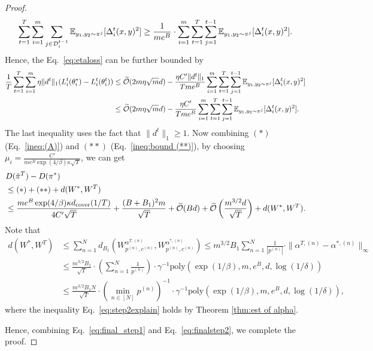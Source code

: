 \begin{proof}
\begin{align}
    \sum_{t=1}^T \sum_{i=1}^m \sum_{j \in \mathcal{D}_i^{t-1}}\mathbb{E}_{y_1,y_2\sim \pi^j}[\Delta_i^t(x,y)^2] \ge \frac{1}{me^B}\cdot \sum_{i=1}^m \sum_{t=1}^T \sum_{j=1}^{t-1}\mathbb{E}_{y_1,y_2\sim \pi^j} [\Delta_i^t(x,y)^2].\nonumber
\end{align}
Hence, the Eq.~\eqref{eq:etaloss} can be further bounded by 
\begin{align}
    \frac{1}{T}\sum_{t=1}^T \sum_{i=1}^m \eta \|d^t\|_1(L_i^t(\theta_i^*) - L_i^t(\theta_i^t)) &\le \widetilde{\mathcal{O}}(2m\eta \sqrt{m}d) - \frac{\eta C' \|d^t\|_1}{Tme^B}\sum_{i=1}^m \sum_{t=1}^T \sum_{j=1}^{t-1}\mathbb{E}_{y_1,y_2\sim \pi^j} [\Delta_i^t(x,y)^2]\label{eq:lossgap1}\\
    &\le \widetilde{\mathcal{O}}(2m\eta \sqrt{m}d) - \frac{\eta C'}{Tme^B}\sum_{i=1}^m \sum_{t=1}^T \sum_{j=1}^{t-1}\mathbb{E}_{y_1,y_2\sim \pi^j} [\Delta_i^t(x,y)^2].\label{eq:lossgap}
\end{align}
The last inequality uses the fact that $\|d^t\|_1 \ge 1.$
 Now combining $(\ast)$ (Eq.~\eqref{ineq:(A)}) and $(\ast\ast)$ (Eq.~\eqref{ineq:bound (**)}), 
by choosing $\mu_i = \frac{C'}{ me^B\exp(4/\beta)\kappa\sqrt{T}}$, we can get 
\begin{align}
    &D(\tilde{\pi}^T) - D(\pi^*) \nonumber\\& \le (*) + (**) + d(W^*, W^T)\nonumber\\
    & \le \frac{me^B\exp(4/\beta)\kappa d_{\mathrm{cover}}(1/T)}{4C'\sqrt{T}} + \frac{(B+B_1)^2m}{\sqrt{T}} +  \widetilde{\mathcal{O}}(Bd) + \widetilde{\mathcal{O}}\left(\frac{m^{3/2}d}{\sqrt{T}}\right) + d(W^*, W^T).\label{eq:final_step1}
\end{align}
Note that 
\begin{align}d(W^*, W^T)&\le  \sum_{n=1}^N d_{B_1}(W_{p^{(n)}, c^{(n)}}^{\alpha^{T,(n)}}, W_{p^{(n)},c^{(n)}}^{\alpha^{*,(n)}})\le m^{3/2}B_1\sum_{n=1}^N \frac{1}{|p^{(n)}|}\cdot \|\alpha^{T,(n)}-\alpha^{*,(n)}\|_\infty\nonumber\\
&\le \frac{m^{3/2}B_1}{\sqrt{T}}\cdot \left(\sum_{n=1}^N \frac{1}{p^{(n)}}\right)\cdot \gamma^{-1}\mathrm{poly}(\exp(1/\beta), m, e^B, d, \log(1/\delta))\label{eq:step2explain}\\
&\le \frac{m^{3/2}B_1N}{\sqrt{T}}\cdot (\min_{n \in [N]}p^{(n)})^{-1} \cdot \gamma^{-1}\mathrm{poly}(\exp(1/\beta), m, e^B, d, \log(1/\delta)),\label{eq:finalstep2}\end{align}
where the inequality Eq.~\eqref{eq:step2explain} holds by Theorem \eqref{thm:est of alpha}.

Hence, combining Eq.~\eqref{eq:final_step1} and Eq.~\eqref{eq:finalstep2}, we complete the proof.
\end{proof}









